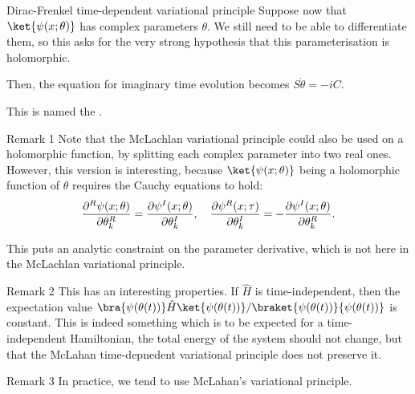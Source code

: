 \documentclass[a4paper]{article}
\begin{document}
\begin{parag}{Dirac-Frenkel time-dependent variational principle}
    Suppose now that $\ket{\psi\left(x; \theta\right)}$ has complex parameters $\theta$. We still need to be able to differentiate them, so this asks for the very strong hypothesis that this parameterisation is holomorphic.

    Then, the equation for imaginary time evolution becomes $S \dot{\theta} = - i C$.

    This is named the .

    \begin{subparag}{Remark 1}
        Note that the McLachlan variational principle could also be used on a holomorphic function, by splitting each complex parameter into two real ones. However, this version is interesting, because $\ket{\psi\left(x; \theta\right)}$ being a holomorphic function of $\theta$ requires the Cauchy equations to hold:
        \[\frac{\partial^R\psi\left(x; \theta\right)}{\partial \theta_k^R} = \frac{\partial \psi^I\left(x; \theta\right)}{\partial \theta_k^I}, \mathspace \frac{\partial \psi^R\left(x; \tau\right)}{\partial \theta_k^I} = -\frac{\partial \psi^I\left(x; \theta\right)}{\partial \theta_k^R}.\]

        This puts an analytic constraint on the parameter derivative, which is not here in the McLachlan variational principle. 
    \end{subparag}

    \begin{subparag}{Remark 2}
        This has an interesting properties. If $\hat{H}$ is time-independent, then the expectation value $\bra{\psi\left(\theta\left(t\right)\right)}\hat{H}\ket{\psi\left(\theta\left(t\right)\right)}/\braket{\psi\left(\theta\left(t\right)\right)}{\psi\left(\theta\left(t\right)\right)}$ is constant. This is indeed something which is to be expected for a time-independent Hamiltonian, the total energy of the system should not change, but that the McLahan time-depnedent variational principle does not preserve it.
    \end{subparag}

    \begin{subparag}{Remark 3}
        In practice, we tend to use McLahan's variational principle.
    \end{subparag}
\end{parag}
\end{document}
